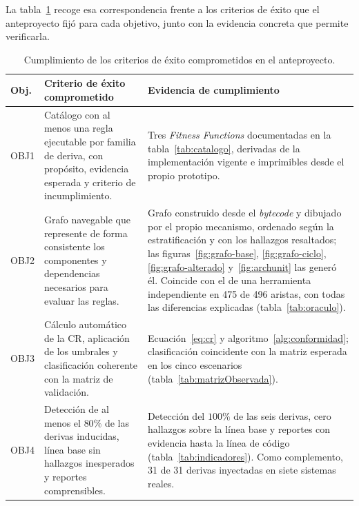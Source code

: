 La tabla~\ref{tab:cierre} recoge esa correspondencia frente a los criterios de éxito que el anteproyecto fijó para cada objetivo, junto con la evidencia concreta que permite verificarla.

\begin{table}[H]
\centering
\caption{Cumplimiento de los criterios de éxito comprometidos en el anteproyecto.}
\label{tab:cierre}
\footnotesize
\begin{tabularx}{\textwidth}{p{1.1cm}p{5.0cm}X}
\toprule
\textbf{Obj.} & \textbf{Criterio de éxito comprometido} & \textbf{Evidencia de cumplimiento} \\
\midrule
OBJ1 & Catálogo con al menos una regla ejecutable por familia de deriva, con propósito, evidencia esperada y criterio de incumplimiento. &
Tres \textit{Fitness Functions} documentadas en la tabla~\ref{tab:catalogo}, derivadas de la implementación vigente e imprimibles desde el propio prototipo. \\
\midrule
OBJ2 & Grafo navegable que represente de forma consistente los componentes y dependencias necesarios para evaluar las reglas. &
Grafo construido desde el \textit{bytecode} y dibujado por el propio mecanismo, ordenado según la estratificación y con los hallazgos resaltados; las figuras~\ref{fig:grafo-base}, \ref{fig:grafo-ciclo}, \ref{fig:grafo-alterado} y~\ref{fig:archunit} las generó él. Coincide con el de una herramienta independiente en 475 de 496 aristas, con todas las diferencias explicadas (tabla~\ref{tab:oraculo}). \\
\midrule
OBJ3 & Cálculo automático de la CR, aplicación de los umbrales y clasificación coherente con la matriz de validación. &
Ecuación~\ref{eq:cr} y algoritmo~\ref{alg:conformidad}; clasificación coincidente con la matriz esperada en los cinco escenarios (tabla~\ref{tab:matrizObservada}). \\
\midrule
OBJ4 & Detección de al menos el $80\%$ de las derivas inducidas, línea base sin hallazgos inesperados y reportes comprensibles. &
Detección del $100\%$ de las seis derivas, cero hallazgos sobre la línea base y reportes con evidencia hasta la línea de código (tabla~\ref{tab:indicadores}). Como complemento, 31 de 31 derivas inyectadas en siete sistemas reales. \\
\bottomrule
\end{tabularx}
\end{table}


